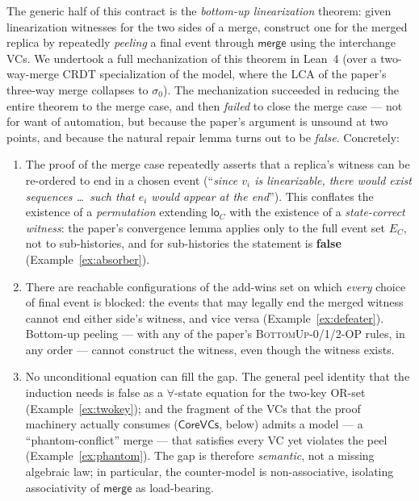 \documentclass[11pt]{article}
\newcommand{\Merge}{\mathsf{merge}}
\newcommand{\Sinit}{\sigma_0}
\newcommand{\co}{\mathsf{CoreVCs}}
\begin{document}
The generic half of this contract is the \emph{bottom-up linearization}
theorem: given linearization witnesses for the two sides of a merge,
construct one for the merged replica by repeatedly \emph{peeling} a final
event through $\Merge$ using the interchange VCs. We undertook a full
mechanization of this theorem in Lean~4 (over a two-way-merge CRDT
specialization of the model, where the LCA of the paper's three-way merge
collapses to $\Sinit$). The mechanization succeeded in reducing the entire
theorem to the merge case, and then \emph{failed} to close the merge case
--- not for want of automation, but because the paper's argument is
unsound at two points, and because the natural repair lemma turns out to
be \emph{false}. Concretely:

\begin{enumerate}[leftmargin=2em]
\item The proof of the merge case repeatedly asserts that a replica's
witness can be re-ordered to end in a chosen event (``\emph{since $v_i$ is
linearizable, there would exist sequences \ldots\ such that $e_i$ would
appear at the end}''). This conflates the existence of a
\emph{permutation} extending $\mathsf{lo}_C$ with the existence of a
\emph{state-correct witness}: the paper's convergence lemma applies only
to the full event set $E_C$, not to sub-histories, and for sub-histories
the statement is \textbf{false} (Example~\ref{ex:absorber}).
\item There are reachable configurations of the add-wins set on which
\emph{every} choice of final event is blocked: the events that may
legally end the merged witness cannot end either side's witness, and vice
versa (Example~\ref{ex:defeater}). Bottom-up peeling --- with any of the
paper's \textsc{BottomUp-0/1/2-OP} rules, in any order --- cannot
construct the witness, even though the witness exists.
\item No unconditional equation can fill the gap. The general peel
identity that the induction needs is false as a $\forall$-state equation
for the two-key OR-set (Example~\ref{ex:twokey}); and the fragment of the
VCs that the proof machinery actually consumes ($\co$, below) admits a
model --- a ``phantom-conflict'' merge --- that satisfies every VC yet
violates the peel (Example~\ref{ex:phantom}). The gap is therefore
\emph{semantic}, not a missing algebraic law; in particular, the
counter-model is non-associative, isolating associativity of $\Merge$ as
load-bearing.
\end{enumerate}
\end{document}
